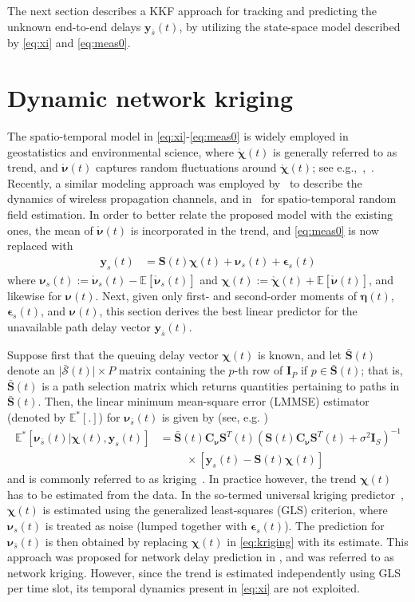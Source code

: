 \documentclass[draftcls,onecolumn,12pt]{IEEEtran}
\providecommand{\abs}[1]{\lvert#1\rvert}												\renewcommand{\b}[1]{\ensuremath{\mathbf{#1}}}		 							\newcommand{\bs}[1]{\ensuremath{\boldsymbol{#1}}}		 						\renewcommand{\c}[1]{\ensuremath{\mathcal{#1}}} 								\newcommand{\E}[1]{\ensuremath{\mathbb{E}\left[#1\right]}} 		  \newcommand{\Es}[1]{\ensuremath{\mathbb{E}^{*}\left[#1\right]}} \newcommand{\ind}{1\hspace{-1.6mm}1}														\newcommand{\norm}[1]{\ensuremath{\left\|#1\right\|}}						\newcommand{\tb}[1]{\ensuremath{\tilde{\mathbf{#1}}}}		 				\newcommand{\mat}[1]{\ensuremath{\begin{bmatrix}#1\end{bmatrix}}}
\newcommand{\mr}[1]{\ensuremath{\mathring{#1}}}
\def \y {{\b{y}}}
\def \yst {{\b{y}_s(t)}}
\def \chit {{\bs{\chi}(t)}}
\def \bnu {{\bs{\nu}}}
\def \nust {{\bs{\nu}_s(t)}}
\def \nubt {{\bs{\nu}_{\bar{s}}(t)}}
\def \epst {{\bs{\epsilon}_s(t)}}
\def \et {{\bs{\eta}(t)}}
\def \cnu {{\b{C}_{\bs{\nu}}}}
\def \cSb {{\bar{\c{S}}(t)}}
\def \St {{\b{S}(t)}}
\def \Stt {{\b{S}^T(t)}}
\def \Sb {{\bar{\b{S}}(t)}}
\def \sbr {{\bar{s}}}
\theoremstyle{plain}\newtheorem{thm}{Theorem}
\theoremstyle{definition}
\theoremstyle{remark}
\begin{document}
The next section describes a KKF approach for tracking and predicting the unknown end-to-end delays $\y_{\bar{s}}(t)$, by utilizing the state-space model described by \eqref{eq:xi} and \eqref{eq:meas0}. 
\section{Dynamic network kriging} \label{kriging}
The spatio-temporal model in \eqref{eq:xi}-\eqref{eq:meas0} is widely employed in geostatistics and environmental science, where $\mr{\bs{\chi}}(t)$ is generally referred to as trend, and $\mr{\bs{\nu}}(t)$ captures random fluctuations around $\mr{\bs{\chi}}(t)$; see e.g.,~\cite[Ch.~4]{Rip81},~\cite{MGRA98,WiC99}. 
Recently, a similar modeling approach was employed by~\cite{kim} to describe the dynamics of wireless propagation channels, and in~\cite{Cor09} for spatio-temporal random field estimation. 
{ In order to better relate the proposed model with the existing ones, the mean of $\mr{\bs{\nu}}(t)$ is incorporated in the trend, and \eqref{eq:meas0} is now replaced with
\begin{align}
\label{eq:meas}
\y_{s}(t) &= \St\bs{\chi}(t) + \bs{\nu}_s(t) + \epst
\end{align}
where $\bs{\nu}_s(t) := \mr{\bs{\nu}}_s(t) - \E{\mr{\bs{\nu}}_s(t)}$ and $\bs{\chi}(t) := \mr{\bs{\chi}}(t) + \E{\mr{\bs{\nu}}(t)}$, and likewise for $\bs{\nu}(t)$.}
Next, given only first- and second-order moments of $\et$, $\epst$, and $\bs{\nu}(t)$, this section derives the best linear predictor for the unavailable path delay vector $\y_{\bar{s}}(t)$.

 

Suppose first that the queuing delay vector $\bs{\chi}(t)$ is known, and let $\Sb$ denote an $\abs{\cSb}\times P$ matrix containing the $p$-th row of $\b{I}_P$ if $p \in \Sb$; that is, $\Sb$ is a path selection matrix which returns quantities pertaining to paths in $\Sb$.
Then, the linear minimum mean-square error (LMMSE) estimator (denoted by $\Es{.}$) for $\bnu_\sbr(t)$ is given by (see, e.g. \cite{AnM79})
\begin{align} \label{eq:kriging}
\Es{\bnu_\sbr(t) | \chit, { \yst}} &= \Sb\cnu\Stt\left(\St\cnu\Stt + \sigma^2\b{I}_S\right)^{-1}\nonumber\\
&\hspace{1cm}\times \left[\yst - \St\chit\right]
\end{align}
and is commonly referred to as kriging~\cite{Cressie}. 
In practice however, the trend $\bs{\chi}(t)$ has to be estimated from the data. 
In the so-termed universal kriging predictor~\cite{Rip81}, $\chit$ is estimated using the generalized least-squares (GLS) criterion, where $\nust$ is treated as noise (lumped together with $\epst$). The prediction for $\nubt$ is then obtained by replacing $\bs{\chi}(t)$ in \eqref{eq:kriging} with its estimate. This approach was proposed for network delay prediction in \cite{nk}, and was referred to as network kriging. 
However, since the trend is estimated independently using GLS per time slot, its temporal dynamics present in \eqref{eq:xi} are not exploited. 
\end{document}
